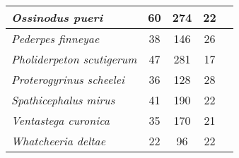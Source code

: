 \begin{tabular}{|L{4.5cm}|c|c|c|L{4.5cm}|}
\textit{Ossinodus pueri}&60&274&22&\citet{Warr04a,Warr07a}\\\hline
\textit{Pederpes finneyae}&38&146&26&\citet{Clac02a}\\\hline
\textit{Pholiderpeton scutigerum}&47&281&17&\citet{Clac87a}\\\hline
\textit{Proterogyrinus scheelei}&36&128&28&\citet{Holm84a}\\\hline
\textit{Spathicephalus mirus}&41&190&22&\citet{Beau98a}\\\hline
\textit{Ventastega curonica}&35&170&21&\citet{Ahlb08a}\\\hline
\textit{Whatcheeria deltae}&22&96&22&\citet{Lomb95a}\\\hline
\end{tabular}
